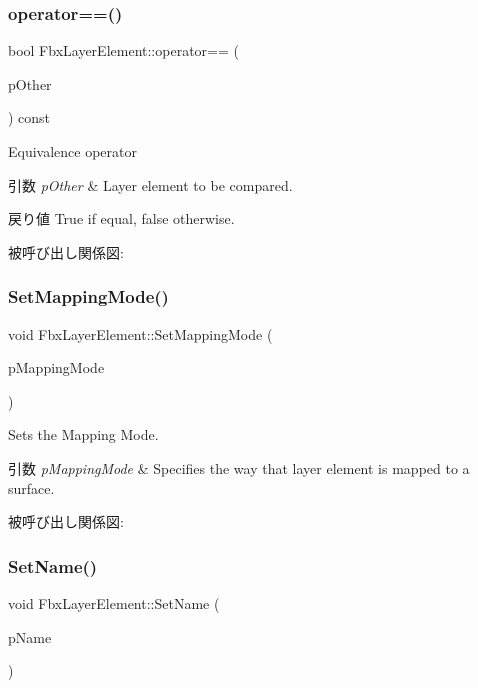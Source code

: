 \subsubsection{\texorpdfstring{operator==()}{operator==()}}
{\footnotesize\ttfamily bool Fbx\+Layer\+Element\+::operator== (\begin{DoxyParamCaption}\item[{const \hyperlink{class_fbx_layer_element}{Fbx\+Layer\+Element} \&}]{p\+Other }\end{DoxyParamCaption}) const}

Equivalence operator 
\begin{DoxyParams}{引数}
{\em p\+Other} & Layer element to be compared. \\
\hline
\end{DoxyParams}
\begin{DoxyReturn}{戻り値}
{\ttfamily True} if equal, {\ttfamily false} otherwise. 
\end{DoxyReturn}
被呼び出し関係図\+:
\mbox{\label{class_fbx_layer_element_af6918a0a87c5df4d257198d3c6a12ee2}} 
\subsubsection{\texorpdfstring{Set\+Mapping\+Mode()}{SetMappingMode()}}
{\footnotesize\ttfamily void Fbx\+Layer\+Element\+::\+Set\+Mapping\+Mode (\begin{DoxyParamCaption}\item[{\hyperlink{class_fbx_layer_element_a5a40e95db30ae9f94611dc3f1568af26}{E\+Mapping\+Mode}}]{p\+Mapping\+Mode }\end{DoxyParamCaption})}

Sets the Mapping Mode. 
\begin{DoxyParams}{引数}
{\em p\+Mapping\+Mode} & Specifies the way that layer element is mapped to a surface. \\
\hline
\end{DoxyParams}
被呼び出し関係図\+:
\mbox{\label{class_fbx_layer_element_a6b7d11d4cc2732537377f9483bac4d52}} 
\subsubsection{\texorpdfstring{Set\+Name()}{SetName()}}
{\footnotesize\ttfamily void Fbx\+Layer\+Element\+::\+Set\+Name (\begin{DoxyParamCaption}\item[{const char $\ast$}]{p\+Name }\end{DoxyParamCaption})}

